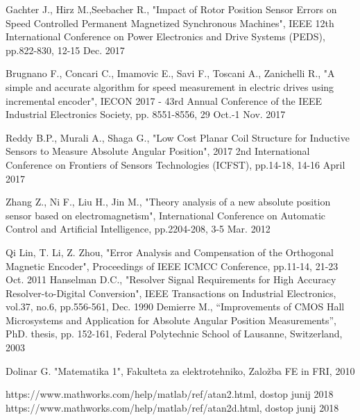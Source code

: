 \documentclass[a4paper]{article}
\begin{document}
\small
\begin{thebibliography}{1}
 Gachter J., Hirz M.,Seebacher R., "Impact of Rotor Position Sensor Errors on Speed
Controlled Permanent Magnetized Synchronous
Machines", IEEE 12th International Conference on Power Electronics and Drive Systems (PEDS), pp.822-830, 12-15 Dec. 2017

 Brugnano F., Concari C., Imamovic E., Savi F., Toscani  A., Zanichelli R., "A simple and accurate algorithm for speed measurement in electric drives using incremental encoder",
IECON 2017 - 43rd Annual Conference of the IEEE Industrial Electronics Society, pp. 8551-8556, 29 Oct.-1 Nov. 2017


 Reddy B.P., Murali A., Shaga G., "Low Cost Planar Coil Structure for Inductive Sensors to Measure Absolute Angular
Position", 2017 2nd International Conference on Frontiers of Sensors Technologies (ICFST), pp.14-18, 14-16 April 2017




 Zhang Z., Ni F., Liu H., Jin M., "Theory analysis of a new absolute position sensor based on electromagnetism", International Conference on Automatic Control and Artificial Intelligence, pp.2204-208, 3-5 Mar. 2012

	
	
 Qi Lin, T. Li, Z. Zhou, "Error Analysis and Compensation
of the Orthogonal Magnetic Encoder", Proceedings of IEEE ICMCC
Conference, pp.11-14, 21-23 Oct. 2011
 Hanselman D.C., "Resolver Signal Requirements for High Accuracy
Resolver-to-Digital Conversion", IEEE Transactions on Industrial
Electronics, vol.37, no.6, pp.556-561, Dec. 1990 
 Demierre M., “Improvements of CMOS Hall Microsystems and
Application for Absolute Angular Position Measurements”, PhD. thesis,
pp. 152-161, Federal Polytechnic School of Lausanne, Switzerland, 2003

 Dolinar G. "Matematika 1", Fakulteta za elektrotehniko, Založba FE in FRI, 2010

 https://www.mathworks.com/help/matlab/ref/atan2.html, dostop junij 2018
 https://www.mathworks.com/help/matlab/ref/atan2d.html, dostop junij 2018



\end{thebibliography}
\end{document}

